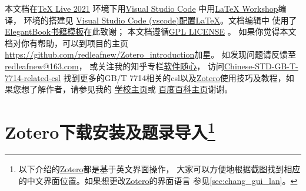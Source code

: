 \documentclass[cn,11pt,chinese]{elegantbook}
\begin{document}
		
		本文档在\href{http://tug.org/texlive/}{\TeX{} Live 2021} 环境下用\href{https://code.visualstudio.com/}{Visual Studio Code}
		中用\href{https://marketplace.visualstudio.com/items?itemName=James-Yu.latex-workshop}{LaTeX Workshop}编译，
		环境的搭建见
		\href{https://zhuanlan.zhihu.com/p/166523064}{Visual Studio Code (vscode)配置LaTeX}。文档编辑中
		使用了\href{https://elegantlatex.org/}{ElegantBook书籍模板}在此致谢；
		本文档遵循\href{https://www.gnu.org/licenses/gpl-3.0.txt}{GPL LICENSE} 。
		如果你觉得本文档对你有帮助，可以到项目的主页
		\url{https://github.com/redleafnew/Zotero_introduction}加星。
		如发现问题请反馈至\href{mailto:redleafnew@163.com}{redleafnew@163.com}，
		或关注我的知乎专栏\href{https://zhuanlan.zhihu.com/c_1071081428967743488}{软件随心}，
		访问\href{https://github.com/redleafnew/Chinese-std-GB-T-7714-related-csl}
		{Chinese-STD-GB-T-7714-related-csl}
		找到更多的GB/T 7714相关的csl以及\href{https://www.zotero.org/}{Zotero}使用技巧及教程，如果您想了解作者，请参见我的
		\href{http://food.njau.edu.cn/info/1129/1315.htm}{学校主页}或
		\href{https://baike.baidu.com/item/%E9%9F%A9%E6%95%8F%E4%B9%89}{百度百科主页}谢谢。

\tableofcontents

\mainmatter
\chapter[Zotero下载安装及题录导入]{Zotero下载安装及题录导入\footnote{以下介绍的\href{https://www.zotero.org/}{Zotero}都是基于英文界面操作，
  		大家可以方便地根据截图找到相应的中文界面位置。如果想更改\href{https://www.zotero.org/}{Zotero}的界面语言
		  参见\cref{sec:chang_gui_lan}。}}\label{ch:install}
\end{document}
